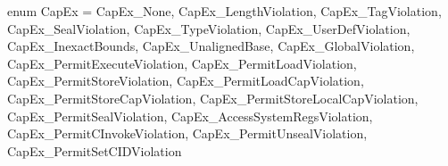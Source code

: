 enum CapEx = {
  CapEx_None,
  CapEx_LengthViolation,
  CapEx_TagViolation,
  CapEx_SealViolation,
  CapEx_TypeViolation,
  CapEx_UserDefViolation,
  CapEx_InexactBounds,
  CapEx_UnalignedBase,
  CapEx_GlobalViolation,
  CapEx_PermitExecuteViolation,
  CapEx_PermitLoadViolation,
  CapEx_PermitStoreViolation,
  CapEx_PermitLoadCapViolation,
  CapEx_PermitStoreCapViolation,
  CapEx_PermitStoreLocalCapViolation,
  CapEx_PermitSealViolation,
  CapEx_AccessSystemRegsViolation,
  CapEx_PermitCInvokeViolation,
  CapEx_PermitUnsealViolation,
  CapEx_PermitSetCIDViolation
}
